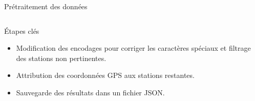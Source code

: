 \documentclass[10pt,svgnames,fragile]{beamer}
\begin{document}
\begin{frame}[label={sec:org88fd8be}]{Prétraitement des données}
\begin{columns}
    \begin{column}{0.5\textwidth}
        \begin{block}{Étapes clés}
        \begin{itemize}
            \item Modification des encodages pour corriger les caractères spéciaux et filtrage des stations non pertinentes.
            \item Attribution des coordonnées GPS aux stations restantes.
            \item Sauvegarde des résultats dans un fichier JSON.
        \end{itemize}
        \end{block}
    \end{column}
    \begin{column}{0.5\textwidth}
        \begin{center}
        \end{center}
    \end{column}
\end{columns}
\end{frame}
\end{document}

